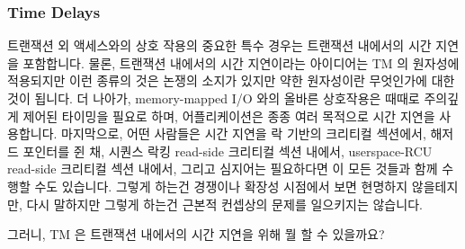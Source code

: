 \fi

\subsubsection{Time Delays}
\label{sec:future:Time Delays}

트랜잭션 외 액세스와의 상호 작용의 중요한 특수 경우는 트랜잭션 내에서의 시간
지연을 포함합니다.
물론, 트랜잭션 내에서의 시간 지연이라는 아이디어는 TM 의 원자성에 적용되지만
이런 종류의 것은 논쟁의 소지가 있지만 약한 원자성이란 무엇인가에 대한 것이
됩니다.
더 나아가, memory-mapped I/O 와의 올바른 상호작용은 때때로 주의깊게 제어된
타이밍을 필요로 하며, 어플리케이션은 종종 여러 목적으로 시간 지연을 사용합니다.
마지막으로, 어떤 사람들은 시간 지연을 락 기반의 크리티컬 섹션에서, 해저드
포인터를 쥔 채, 시퀀스 락킹 read-side 크리티컬 섹션 내에서, userspace-RCU
read-side 크리티컬 섹션 내에서, 그리고 심지어는 필요하다면 이 모든 것들과 함께
수행할 수도 있습니다.
그렇게 하는건 경쟁이나 확장성 시점에서 보면 현명하지 않을테지만, 다시 말하지만
그렇게 하는건 근본적 컨셉상의 문제를 일으키지는 않습니다.

그러니, TM 은 트랜잭션 내에서의 시간 지연을 위해 뭘 할 수 있을까요?

